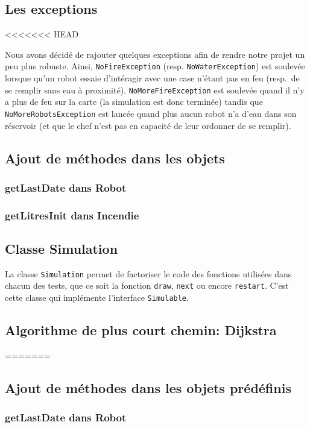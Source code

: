 \documentclass[a4paper,8pt]{article} %
\begin{document}
\begin{itemize}
\end{itemize}

\subsection{Les exceptions}
<<<<<<< HEAD

Nous avons décidé de rajouter quelques exceptions afin de rendre notre projet un peu plus robuste. 
Ainsi, {\tt NoFireException} (resp. {\tt NoWaterException}) est soulevée lorsque qu'un robot essaie d'intéragir avec une case n'étant pas en feu (resp.\ de se remplir sans eau à proximité).
{\tt NoMoreFireException} est soulevée quand il n'y a plus de feu sur la carte (la simulation est donc terminée) tandis que {\tt NoMoreRobotsException} est lancée quand plus aucun robot n'a d'eau dans son réservoir (et que le chef n'est pas en capacité de leur ordonner de se remplir).

\subsection{Ajout de méthodes dans les objets}
\subsubsection{getLastDate dans Robot}
\subsubsection{getLitresInit dans Incendie}
\subsection{Classe Simulation}

La classe {\tt Simulation} permet de factoriser le code des fonctions utilisées dans chacun des tests, que ce soit la fonction {\tt draw}, {\tt next} ou encore {\tt restart}.
C'est cette classe qui implémente l'interface {\tt Simulable}.

\subsection{Algorithme de plus court chemin: Dijkstra}
=======
\subsection{Ajout de méthodes dans les objets prédéfinis}
\subsubsection{getLastDate dans Robot}
\end{document}
